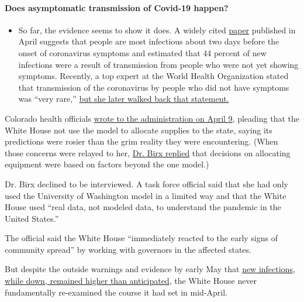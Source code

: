 \begin{itemize}
{  \paragraph{Does asymptomatic transmission of Covid-19
  happen?}\label{does-asymptomatic-transmission-of-covid-19-happen}}

  \begin{itemize}
  \tightlist
  \item
    So far, the evidence seems to show it does. A widely cited
    \href{https://www.nature.com/articles/s41591-020-0869-5}{paper}
    published in April suggests that people are most infectious about
    two days before the onset of coronavirus symptoms and estimated that
    44 percent of new infections were a result of transmission from
    people who were not yet showing symptoms. Recently, a top expert at
    the World Health Organization stated that transmission of the
    coronavirus by people who did not have symptoms was ``very rare,''
    \href{https://www.nytimes.com/2020/06/09/world/coronavirus-updates.html?action=click\&pgtype=Article\&state=default\&region=MAIN_CONTENT_3\&context=storylines_faq\#link-1f302e21}{but
    she later walked back that statement.}
  \end{itemize}
\end{itemize}

Colorado health officials
\href{https://documentingcovid19.io/uploads/DHS\%20HHS\%20ventilator\%20usage\%20by\%20state\%20April\%2012.pdf}{wrote
to the administration on April 9}, pleading that the White House not use
the model to allocate supplies to the state, saying its predictions were
rosier than the grim reality they were encountering. (When those
concerns were relayed to her,
\href{https://www.documentcloud.org/documents/6994649-2020-04-13-Colorado-Re-Birx-IHME-Colorado-FOIA.html}{Dr.
Birx replied} that decisions on allocating equipment were based on
factors beyond the one model.)

Dr. Birx declined to be interviewed. A task force official said that she
had only used the University of Washington model in a limited way and
that the White House used ``real data, not modeled data, to understand
the pandemic in the United States.''

The official said the White House ``immediately reacted to the early
signs of community spread'' by working with governors in the affected
states.

But despite the outside warnings and evidence by early May that
\href{https://www.nytimes.com/interactive/2020/us/coronavirus-us-cases.html}{new
infections, while down, remained higher than anticipated}, the White
House never fundamentally re-examined the course it had set in
mid-April.

